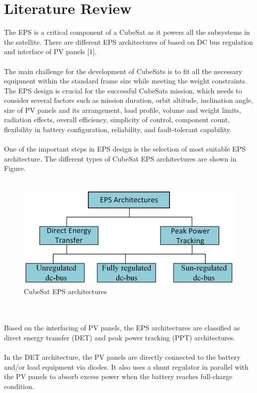 \section{Literature Review}
\justifying
The EPS is a critical component of a CubeSat as it powers all the subsystems in the satellite. There are different EPS architectures of based on DC bus regulation and interface of PV panels [1].
\\ \\
The main challenge for the development of CubeSats is to fit all the necessary equipment within the standard frame size while meeting the weight constraints. The EPS design is crucial for the successful CubeSats mission, which needs to consider several factors such as mission duration, orbit altitude, inclination angle, size of PV panels and its arrangement, load profile, volume and weight limits, radiation effects, overall efficiency, simplicity of control, component count, flexibility in battery configuration, reliability, and fault-tolerant capability. 
\\ \\
One of the important steps in EPS design is the selection of most suitable EPS architecture. The different types of CubeSat EPS architectures are shown in Figure. 
\\ \\
\begin{figure}[h]
	\centering
	\includegraphics[width=\columnwidth]{IMGS/EPSarchitectures.png}
	\caption{CubeSat EPS architectures}
	\label{fig:arch}
\end{figure} 
\\ \\
Based on the interfacing of PV panels, the EPS architectures are classified as direct energy transfer (DET) and peak power tracking (PPT) architectures. 
\\ \\
In the DET architecture, the PV panels are directly connected to the battery and/or load equipment via diodes. It also uses a shunt regulator in parallel with the PV panels to absorb excess power when the battery reaches full-charge condition.
